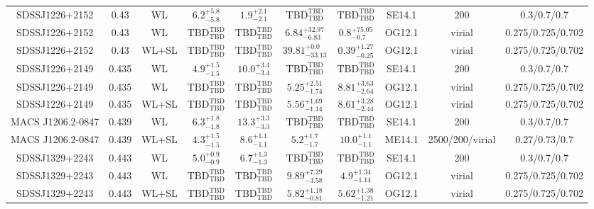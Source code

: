 \begin{table}
\begin{tabular}{cccccccccc}
SDSSJ1226+2152 & 0.43 & WL & ${6.2}^{+5.8}_{-5.8}$ & ${1.9}^{+2.1}_{-2.1}$ & ${\mathrm{TBD}}^{\mathrm{TBD}}_{\mathrm{TBD}}$ & ${\mathrm{TBD}}^{\mathrm{TBD}}_{\mathrm{TBD}}$ & SE14.1 & 200 & 0.3/0.7/0.7 \\
SDSSJ1226+2152 & 0.43 & WL & ${\mathrm{TBD}}^{\mathrm{TBD}}_{\mathrm{TBD}}$ & ${\mathrm{TBD}}^{\mathrm{TBD}}_{\mathrm{TBD}}$ & ${6.84}^{+32.97}_{-6.83}$ & ${0.8}^{+75.05}_{-0.7}$ & OG12.1 & virial & 0.275/0.725/0.702 \\
SDSSJ1226+2152 & 0.43 & WL+SL & ${\mathrm{TBD}}^{\mathrm{TBD}}_{\mathrm{TBD}}$ & ${\mathrm{TBD}}^{\mathrm{TBD}}_{\mathrm{TBD}}$ & ${39.81}^{+0.0}_{-33.13}$ & ${0.39}^{+1.27}_{-0.25}$ & OG12.1 & virial & 0.275/0.725/0.702 \\
SDSSJ1226+2149 & 0.435 & WL & ${4.9}^{+1.5}_{-1.5}$ & ${10.0}^{+3.4}_{-3.4}$ & ${\mathrm{TBD}}^{\mathrm{TBD}}_{\mathrm{TBD}}$ & ${\mathrm{TBD}}^{\mathrm{TBD}}_{\mathrm{TBD}}$ & SE14.1 & 200 & 0.3/0.7/0.7 \\
SDSSJ1226+2149 & 0.435 & WL & ${\mathrm{TBD}}^{\mathrm{TBD}}_{\mathrm{TBD}}$ & ${\mathrm{TBD}}^{\mathrm{TBD}}_{\mathrm{TBD}}$ & ${5.25}^{+2.51}_{-1.74}$ & ${8.81}^{+3.63}_{-2.64}$ & OG12.1 & virial & 0.275/0.725/0.702 \\
SDSSJ1226+2149 & 0.435 & WL+SL & ${\mathrm{TBD}}^{\mathrm{TBD}}_{\mathrm{TBD}}$ & ${\mathrm{TBD}}^{\mathrm{TBD}}_{\mathrm{TBD}}$ & ${5.56}^{+1.69}_{-1.14}$ & ${8.61}^{+3.28}_{-2.44}$ & OG12.1 & virial & 0.275/0.725/0.702 \\
MACS J1206.2-0847 & 0.439 & WL & ${6.3}^{+1.8}_{-1.8}$ & ${13.3}^{+3.3}_{-3.3}$ & ${\mathrm{TBD}}^{\mathrm{TBD}}_{\mathrm{TBD}}$ & ${\mathrm{TBD}}^{\mathrm{TBD}}_{\mathrm{TBD}}$ & SE14.1 & 200 & 0.3/0.7/0.7 \\
MACS J1206.2-0847 & 0.439 & WL+SL & ${4.3}^{+1.5}_{-1.5}$ & ${8.6}^{+1.1}_{-1.1}$ & ${5.2}^{+1.7}_{-1.7}$ & ${10.0}^{+1.1}_{-1.1}$ & ME14.1 & 2500/200/virial & 0.27/0.73/0.7 \\
SDSSJ1329+2243 & 0.443 & WL & ${5.0}^{+0.9}_{-0.9}$ & ${6.7}^{+1.3}_{-1.3}$ & ${\mathrm{TBD}}^{\mathrm{TBD}}_{\mathrm{TBD}}$ & ${\mathrm{TBD}}^{\mathrm{TBD}}_{\mathrm{TBD}}$ & SE14.1 & 200 & 0.3/0.7/0.7 \\
SDSSJ1329+2243 & 0.443 & WL & ${\mathrm{TBD}}^{\mathrm{TBD}}_{\mathrm{TBD}}$ & ${\mathrm{TBD}}^{\mathrm{TBD}}_{\mathrm{TBD}}$ & ${9.89}^{+7.29}_{-3.58}$ & ${4.9}^{+1.34}_{-1.14}$ & OG12.1 & virial & 0.275/0.725/0.702 \\
SDSSJ1329+2243 & 0.443 & WL+SL & ${\mathrm{TBD}}^{\mathrm{TBD}}_{\mathrm{TBD}}$ & ${\mathrm{TBD}}^{\mathrm{TBD}}_{\mathrm{TBD}}$ & ${5.82}^{+1.18}_{-0.81}$ & ${5.62}^{+1.38}_{-1.21}$ & OG12.1 & virial & 0.275/0.725/0.702 \\

\end{tabular}
\end{table}
